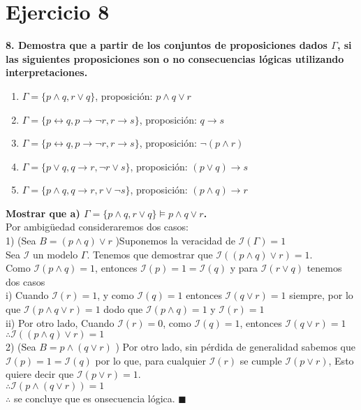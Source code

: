 \chapter*{Ejercicio 8}
\textbf{8. Demostra que a partir de los conjuntos de proposiciones dados $\Gamma$, si las siguientes proposiciones son o no consecuencias lógicas utilizando interpretaciones.}
\begin{multicols}{2}
	\begin{enumerate}[label=\alph*)]
		\item $\Gamma = \{p\land q, r\lor q\}$, proposición: $p \land q\lor r$
		\item $\Gamma = \{p\leftrightarrow q,p\rightarrow \neg r,r\rightarrow s\}$, proposición: $q\rightarrow s$
		\item $\Gamma = \{p\leftrightarrow q,p\rightarrow \neg r,r\rightarrow s\}$, proposición: $\neg (p\land r)$
		\item $\Gamma = \{p\lor q, q\rightarrow r, \neg r \lor s\}$, proposición: $(p\lor q)\rightarrow s$
		\item $\Gamma = \{p\land q, q\rightarrow r, r \lor \neg s\}$, proposición: $(p \land q)\rightarrow r$
	\end{enumerate}
\end{multicols}

\textbf{Mostrar que a) 	$\Gamma=\{p\land q, r\lor q\} \vDash p \land q\lor r$.}\\
Por ambigüedad consideraremos dos casos:\\
1) (Sea $B=(p\land q)\lor r$ )Suponemos la veracidad de $\mathcal{I}(\Gamma)=1$\\
Sea $\mathcal{I}$ un modelo $\Gamma$. Tenemos que demostrar que $\mathcal{I}((p \land q)\lor r)=1$.\\
Como $\mathcal{I}(p\land q)=1$, entonces $\mathcal{I}(p)=1=\mathcal{I}(q)$ y para $\mathcal{I}(r\lor q)$ tenemos dos casos\\
\indent i) Cuando $\mathcal{I}(r)=1$, y como $\mathcal{I}(q)=1$ entonces $\mathcal{I}(q\lor r)=1$ siempre, por lo que $\mathcal{I}(p \land q\lor r)=1$ dodo que $\mathcal{I}(p \land q)=1$ y $\mathcal{I}(r)=1$\\
\indent ii) Por otro lado, Cuando $\mathcal{I}(r)=0$, como $\mathcal{I}(q)=1$, entonces $\mathcal{I}(q\lor r)=1$\\
$\therefore \mathcal{I}((p\land q)\lor r)=1$\\
2) (Sea $B=p\land (q\lor r)$ ) Por otro lado, sin pérdida de generalidad sabemos que $\mathcal{I}(p)=1=\mathcal{I}(q)$
por lo que, para cualquier $\mathcal{I}(r)$ se cumple $\mathcal{I}(p\lor r)$, Esto quiere decir que $\mathcal{I}(p\lor r)=1$.\\
$\therefore \mathcal{I}(p\land (q\lor r))=1$\\
$\therefore$ se concluye que es onsecuencia lógica. $\blacksquare$


